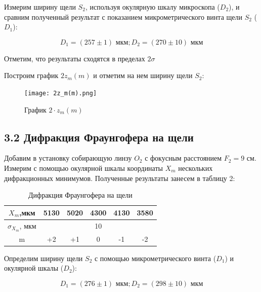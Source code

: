 \documentclass[a4paper,12pt]{report}
\begin{document}
Измерим ширину щели $S_{2}$, используя окулярную шкалу микроскопа ($D_{2}$), и сравним полученный результат с показанием микрометрического винта щели $S_{2}$ ($D_{1}$): 

\begin{equation}
D_{1} = (257 \pm 1) \text{ мкм}; D_{2} = (270 \pm 10) \text{ мкм}
\end{equation}

Отметим, что результаты сходятся в пределах $2\sigma$

Построим график $2z_{m}(m)$ и отметим на нем ширину щели $S_{2}$:

\begin{figure}[H]
\texttt{[image: 2z\_m(m).png]}
\centering
\caption{График $2\cdot z_{m}(m)$ }
\end{figure}

\subsection*{3.2 Дифракция Фраунгофера на щели }

Добавим в установку собирающую линзу $O_{2}$ с фокусным расстоянием $F_{2} = 9$ см.
Измерим с помощью окулярной шкалы координаты $X_{m}$ нескольких дифракционных минимумов. Полученные результаты занесем в таблицу 2:

\begin{table}[H]
\begin{tabular}{|c|ccccc|}
\hline
$X_{m}$,мкм        & \multicolumn{1}{c|}{5130} & \multicolumn{1}{c|}{5020} & \multicolumn{1}{c|}{4300} & \multicolumn{1}{c|}{4130} & 3580 \\ \hline
$\sigma_{X_{m}}$, мкм & \multicolumn{5}{c|}{10}                                                                                              \\ \hline
m             & \multicolumn{1}{c|}{+2}   & \multicolumn{1}{c|}{+1}   & \multicolumn{1}{c|}{0}    & \multicolumn{1}{c|}{-1}   & -2   \\ \hline
\end{tabular}
\caption{Дифракция Фраунгофера на щели}
\end{table}

Определим ширину щели $S_{2}$ с помощью микрометрического винта ($D_{1}$) и окулярной шкалы ($D_{2}$): 

\begin{equation}
D_{1} = (276 \pm 1) \text{ мкм}; D_{2} = (298 \pm 10) \text{ мкм}
\end{equation}
\end{document}
